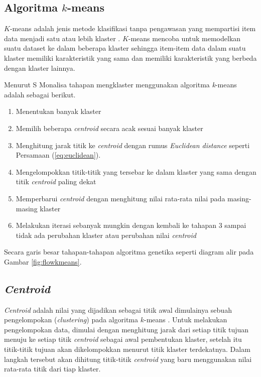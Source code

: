 \subsection{Algoritma $k$-means}

$K$-means adalah jenis metode klasifikasi tanpa pengawasan yang mempartisi item data menjadi satu atau lebih klaster \cite{agusta2007k}. $K$-means mencoba untuk memodelkan suatu dataset ke dalam beberapa klaster sehingga item-item data dalam suatu klaster memiliki karakteristik yang sama dan memiliki karakteristik yang berbeda dengan klaster lainnya.

Menurut S Monalisa \cite{monalisa2018klasterisasi} tahapan mengklaster menggunakan algoritma \textit{k}-means adalah sebagai berikut.

\begin{enumerate}
	\item Menentukan banyak klaster
	\item Memilih beberapa \textit{centroid} secara acak sesuai banyak klaster
	\item Menghitung jarak titik ke \textit{centroid} dengan rumus \textit{Euclidean distance} seperti Persamaan (\ref{eq:euclidean}).
	\item Mengelompokkan titik-titik yang tersebar ke dalam klaster yang sama dengan titik \textit{centroid} paling dekat
	\item Memperbarui \textit{centroid} dengan menghitung nilai rata-rata nilai pada masing-masing klaster
	\item Melakukan iterasi sebanyak mungkin dengan kembali ke tahapan 3 sampai tidak ada perubahan klaster atau perubahan nilai \textit{centroid}
\end{enumerate}

\noindent Secara garis besar tahapan-tahapan algoritma genetika seperti diagram alir pada Gambar \ref{fig:flowkmeans}.



\subsection{\textit{Centroid}}

\textit{Centroid} adalah nilai yang dijadikan sebagai titik awal dimulainya sebuah pengelompokan (\textit{clustering}) pada algoritma $k$-means \cite{retno2019peningkatan}. Untuk melakukan pengelompokan data, dimulai dengan menghitung jarak dari setiap titik tujuan menuju ke setiap titik \textit{centroid} sebagai awal pembentukan klaster, setelah itu titik-titik tujuan akan dikelompokkan menurut titik klaster terdekatnya. Dalam langkah tersebut akan dihitung titik-titik \textit{centroid} yang baru menggunakan nilai rata-rata titik dari tiap klaster.

